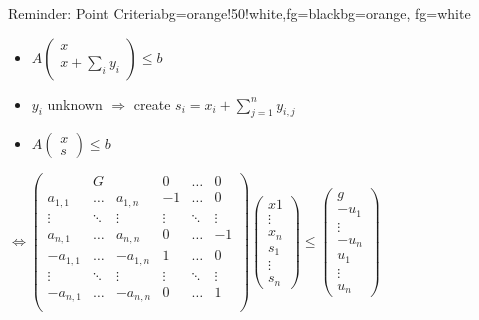 \begin{frame}
	\begin{variableblock}{Reminder: Point Criteria}{bg=orange!50!white,fg=black}{bg=orange, fg=white}
		\begin{itemize}
			\setlength{\itemindent}{1cm}
			\item[(point)] $A\begin{pmatrix} x \\ x + \sum_i y_i \end{pmatrix} \le b$
		\end{itemize}
	\end{variableblock}
	\begin{itemize}
		\item $y_i$ unknown $\Rightarrow$ create $s_i=x_i+\sum_{j=1}^n y_{i,j}$
		\item $A\begin{pmatrix} x \\ s \end{pmatrix} \le b$ \newline
	\end{itemize}
	$\Leftrightarrow \begin{pmatrix}
	& G 		& 			& 0 	 & \dots  & 0 \\
	a_{1,1}  & \dots 	& a_{1,n}	& -1 	 & \dots  & 0 \\
	\vdots   & \ddots 	& \vdots	& \vdots & \ddots & \vdots \\
	a_{n,1}  & \dots 	& a_{n,n}	& 0 	 & \dots  & -1 \\
	-a_{1,1} & \dots 	& -a_{1,n}	& 1 	 & \dots  & 0 \\
	\vdots   & \ddots 	& \vdots	& \vdots & \ddots & \vdots \\
	-a_{n,1} & \dots 	& -a_{n,n}	& 0 	 & \dots  & 1 \\
	\end{pmatrix} \begin{pmatrix} x1 \\ \vdots \\ x_n \\ s_1 \\ \vdots \\ s_n\end{pmatrix} \le \begin{pmatrix} g \\ -u_1 \\ \vdots\\ -u_n \\ u_1 \\ \vdots \\ u_n \end{pmatrix}$\\ %
\end{frame}

